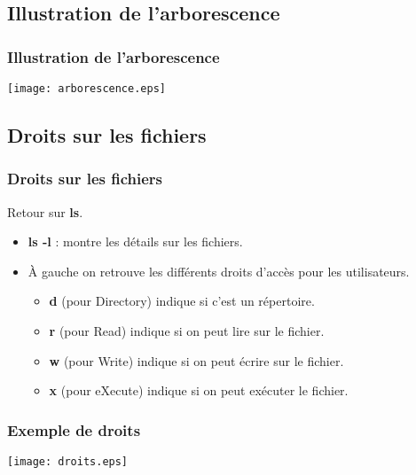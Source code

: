 \documentclass{beamer}
\begin{document}
    \subsection{Illustration de l'arborescence}
    \begin{frame}
        \frametitle{Illustration de l'arborescence}
        \texttt{[image: arborescence.eps]}
    \end{frame}

    \subsection{Droits sur les fichiers}
    \begin{frame}
        \frametitle{Droits sur les fichiers}
        Retour sur {\bf ls}.
        \begin{itemize}
            \item {\bf ls -l} : montre les détails sur les fichiers.
            \item À gauche on retrouve les différents droits d'accès pour les utilisateurs.
                \begin{itemize}
                    \item {\bf d} (pour Directory) indique si c'est un répertoire.
                    \item {\bf r} (pour Read) indique si on peut lire sur le fichier.
                    \item {\bf w} (pour Write) indique si on peut écrire sur le fichier.
                    \item {\bf x} (pour eXecute) indique si on peut exécuter le fichier.
                \end{itemize}
        \end{itemize}
    \end{frame}

    \begin{frame}
        \frametitle{Exemple de droits}
        \texttt{[image: droits.eps]}
    \end{frame}
\end{document}
